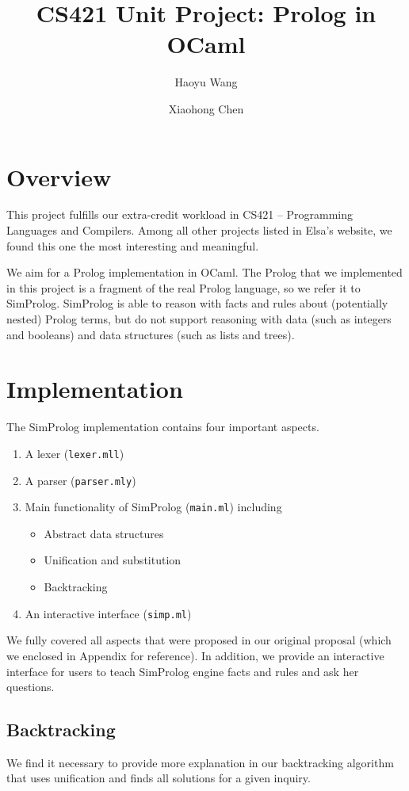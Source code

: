 \documentclass{article}
\title{CS421 Unit Project: Prolog in OCaml}
\author{Haoyu Wang  \and Xiaohong Chen}
\begin{document}
\maketitle

\section{Overview}

This project fulfills our extra-credit workload in CS421 -- Programming Languages and Compilers. Among all other projects listed in Elsa's website, we found this one the most interesting and meaningful.

We aim for a Prolog implementation in OCaml. The Prolog that we implemented in this project is a fragment of the real Prolog language, so we refer it to SimProlog. SimProlog is able to reason with facts and rules about (potentially nested) Prolog terms, but do not support reasoning with data (such as integers and booleans) and data structures (such as lists and trees). 

\section{Implementation}

The SimProlog implementation contains four important aspects.
\begin{enumerate}
	\item A lexer ({\tt lexer.mll})
	\item A parser ({\tt parser.mly})
	\item Main functionality of SimProlog ({\tt main.ml}) including
	\begin{itemize}
		\item Abstract data structures
		\item Unification and substitution
		\item Backtracking
	\end{itemize}
	\item An interactive interface ({\tt simp.ml})
\end{enumerate}

We fully covered all aspects that were proposed in our original proposal (which we enclosed in Appendix for reference). In addition, we provide an interactive interface for users to teach SimProlog engine facts and rules and ask her questions.

\subsection{Backtracking}
We find it necessary to provide more explanation in our backtracking algorithm that uses unification and finds all solutions for a given inquiry.
\end{document}
